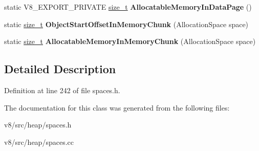 \begin{DoxyCompactItemize}
\mbox{\label{classv8_1_1internal_1_1MemoryChunkLayout_acb3087307e0af710c70e02f04e4cee3d}} 
static V8\+\_\+\+E\+X\+P\+O\+R\+T\+\_\+\+P\+R\+I\+V\+A\+TE \mbox{\hyperlink{classsize__t}{size\+\_\+t}} {\bfseries Allocatable\+Memory\+In\+Data\+Page} ()
\item 
\mbox{\label{classv8_1_1internal_1_1MemoryChunkLayout_a4ae139415acdf3376896024f2be2075a}} 
static \mbox{\hyperlink{classsize__t}{size\+\_\+t}} {\bfseries Object\+Start\+Offset\+In\+Memory\+Chunk} (Allocation\+Space space)
\item 
\mbox{\label{classv8_1_1internal_1_1MemoryChunkLayout_a11fa6068e3f1c865705323a55133b0f6}} 
static \mbox{\hyperlink{classsize__t}{size\+\_\+t}} {\bfseries Allocatable\+Memory\+In\+Memory\+Chunk} (Allocation\+Space space)
\end{DoxyCompactItemize}


\subsection{Detailed Description}


Definition at line 242 of file spaces.\+h.



The documentation for this class was generated from the following files\+:\begin{DoxyCompactItemize}
\item 
v8/src/heap/spaces.\+h\item 
v8/src/heap/spaces.\+cc\end{DoxyCompactItemize}
